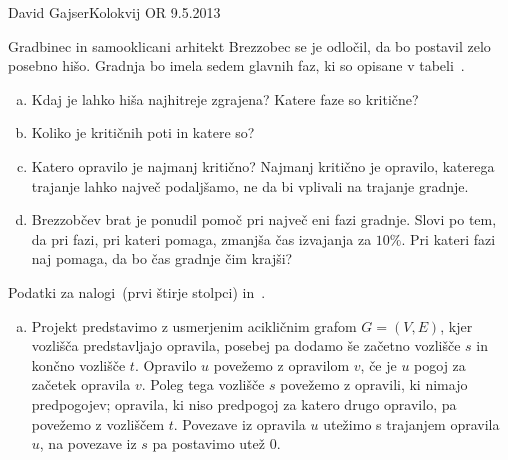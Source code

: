 \begin{naloga}{David Gajser}{Kolokvij OR 9.5.2013}
\begin{vprasanje}
Gradbinec in samooklicani arhitekt Brezzobec se je odločil,
da bo postavil zelo posebno hišo.
Gradnja bo imela sedem glavnih faz,
ki so opisane v tabeli~\tab.
\begin{enumerate}[(a)]
\item Kdaj je lahko hiša najhitreje zgrajena?
Katere faze so kritične?
\item Koliko je kritičnih poti in katere so?
\item Katero opravilo je najmanj kritično?
Najmanj kritično je opravilo, katerega trajanje lahko največ podaljšamo,
ne da bi vplivali na trajanje gradnje.
\item Brezzobčev brat je ponudil pomoč pri največ eni fazi gradnje.
Slovi po tem, da pri fazi, pri kateri pomaga, zmanjša čas izvajanja za $10\%$.
Pri kateri fazi naj pomaga, da bo čas gradnje čim krajši?
\end{enumerate}

\begin{tabela}
\caption{Podatki za nalogi~\nal (prvi štirje stolpci)
in~\nal[brezzobec-lp].}
\end{tabela}
\end{vprasanje}

\begin{odgovor}
\begin{enumerate}[(a)]
\item Projekt predstavimo z usmerjenim acikličnim grafom $G = (V, E)$,
kjer vozlišča predstavljajo opravila,
posebej pa dodamo še začetno vozlišče $s$ in končno vozlišče $t$.
Opravilo $u$ povežemo z opravilom $v$,
če je $u$ pogoj za začetek opravila $v$.
Poleg tega vozlišče $s$ povežemo z opravili, ki nimajo predpogojev;
opravila, ki niso predpogoj za katero drugo opravilo,
pa povežemo z vozliščem $t$.
Povezave iz opravila $u$ utežimo s trajanjem opravila $u$,
na povezave iz $s$ pa postavimo utež $0$.


\end{enumerate}
\end{odgovor}
\end{naloga}

